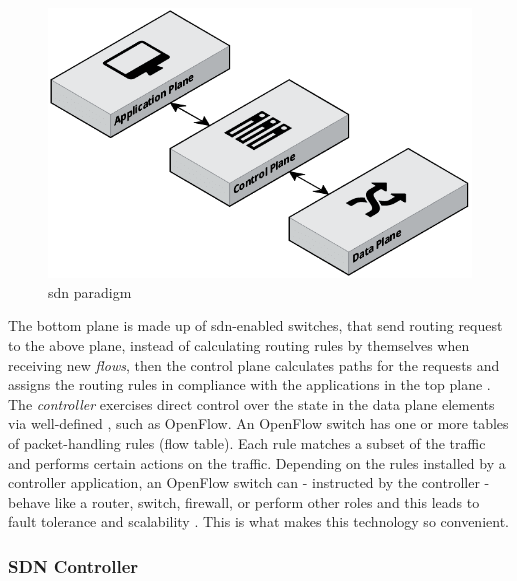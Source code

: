 \begin{figure}[h!]
    \centering
    \includegraphics[scale=0.33]{assets/figures/chapter2/SDN Paradigm.png}
    \caption{\gls{sdn} paradigm}
    \label{fig:sdn-paradigm}
\end{figure}
\noindent The bottom plane is made up of \gls{sdn}-enabled switches, that send routing request to the above plane, instead of calculating routing rules by themselves when receiving new \textit{flows}, then the control plane calculates paths for the requests and assigns the routing rules in compliance with the applications in the top plane \cite{Xu2017}. The \textit{controller} exercises direct control over the state in the data plane elements via well-defined , such as OpenFlow. An OpenFlow switch has one or more tables of packet-handling rules (flow table). Each rule matches a subset of the traffic and performs certain actions on the traffic. Depending on the rules installed by a controller application, an OpenFlow switch can - instructed by the controller - behave like a router, switch, firewall, or perform other roles and this leads to fault tolerance and scalability \cite{Lantz2015}. This is what makes this technology so convenient.


\subsubsection{SDN Controller}
\label{subsubsec:sdn-controller}

